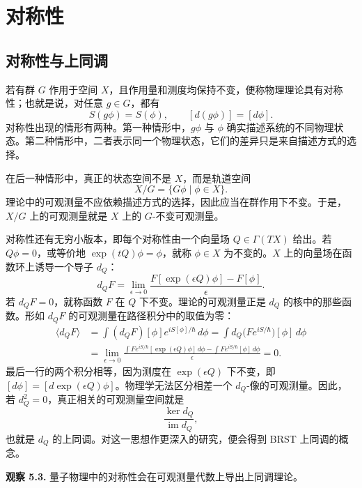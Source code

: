 \section{对称性}
\subsection{对称性与上同调}
若有群 $G$ 作用于空间 $X$，且作用量和测度均保持不变，便称物理理论具有对称性；也就是说，对任意 $g\in G$，都有
\[
  S(g\phi)=S(\phi),\qquad [d(g\phi)]=[d\phi].
\]
对称性出现的情形有两种。第一种情形中，$g\phi$ 与 $\phi$ 确实描述系统的不同物理状态。第二种情形中，二者表示同一个物理状态，它们的差异只是来自描述方式的选择。

在后一种情形中，真正的状态空间不是 $X$，而是轨道空间
\[
  X/G=\{G\phi\mid \phi\in X\}.
\]
理论中的可观测量不应依赖描述方式的选择，因此应当在群作用下不变。于是，$X/G$ 上的可观测量就是 $X$ 上的 $G$-不变可观测量。

对称性还有无穷小版本，即每个对称性由一个向量场 $Q\in\Gamma(TX)$ 给出。若 $Q\phi=0$，或等价地 $\exp(tQ)\phi=\phi$，就称 $\phi\in X$ 为不变的。$X$ 上的向量场在函数环上诱导一个导子 $d_Q$：
\[
  d_QF=\lim_{\epsilon\to0}
  \frac{F[\exp(\epsilon Q)\phi]-F[\phi]}{\epsilon}.
\]
若 $d_QF=0$，就称函数 $F$ 在 $Q$ 下不变。理论的可观测量正是 $d_Q$ 的核中的那些函数。形如 $d_QF$ 的可观测量在路径积分中的取值为零：
\begin{align*}
  \langle d_QF\rangle
  &=\int (d_QF)[\phi]e^{iS[\phi]/\hbar}\,d\phi
    =\int d_Q\bigl(Fe^{iS/\hbar}\bigr)[\phi]\,d\phi\\
  &=\lim_{\epsilon\to0}
    \frac{\int Fe^{iS/\hbar}[\exp(\epsilon Q)\phi]\,d\phi-
                \int Fe^{iS/\hbar}[\phi]\,d\phi}{\epsilon}=0.
\end{align*}
最后一行的两个积分相等，因为测度在 $\exp(\epsilon Q)$ 下不变，即 $[d\phi]=[d\exp(\epsilon Q)\phi]$。物理学无法区分相差一个 $d_Q$-像的可观测量。因此，若 $d_Q^2=0$，真正相关的可观测量空间就是
\[
  \frac{\ker d_Q}{\operatorname{im}d_Q},
\]
也就是 $d_Q$ 的上同调。对这一思想作更深入的研究，便会得到 BRST 上同调的概念。

\begin{note}\label{note:quantum-symmetry-cohomology}
\textbf{观察 5.3.} 量子物理中的对称性会在可观测量代数上导出上同调理论。
\end{note}

